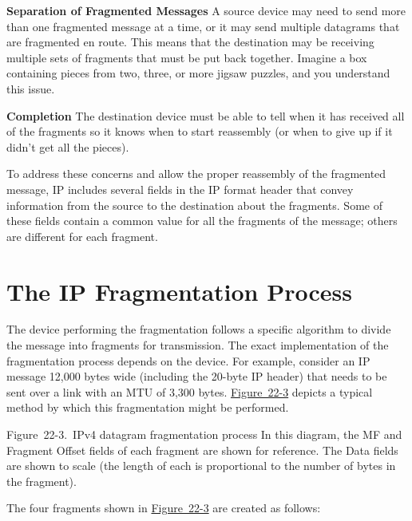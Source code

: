 {\textbf{Separation of Fragmented Messages}} A source device may need to
send more than one fragmented message at a time, or it may send multiple
datagrams that are fragmented en route. This means that the destination
may be receiving multiple sets of fragments that must be put back
together. Imagine a box containing pieces from two, three, or more
jigsaw puzzles, and you understand this issue.

{\textbf{Completion}} The destination device must be able to tell when
it has received all of the fragments so it knows when to start
reassembly (or when to give up if it didn't get all the pieces).

To address these concerns and allow the proper reassembly of the
fragmented message, IP includes several fields in the IP format header
that convey information from the source to the destination about the
fragments. Some of these fields contain a common value for all the
fragments of the message; others are different for each fragment.




\section{The IP Fragmentation Process}

\protect\hypertarget{ch22s02.htmlux5cux23idx-CHP-22-0808}{}{}The device
performing the fragmentation follows a specific algorithm to divide the
message into fragments for transmission. The exact implementation of the
fragmentation process depends on the device. For example, consider an IP
message 12,000 bytes wide (including the 20-byte IP header) that needs
to be sent over a link with an MTU of 3,300 bytes.
\protect\hyperlink{ch22s02.htmlux5cux23ipv4_datagram_fragmentation_process_in_t}{Figure~22-3}
depicts a typical method by which this fragmentation might be performed.

\protect\hypertarget{ch22s02.htmlux5cux23ipv4_datagram_fragmentation_process_in_t}{}{}

\protect\hypertarget{ch22s02.htmlux5cux23I_mediaobject8_d1e23900}{}{}

Figure~22-3.~IPv4 datagram fragmentation process In this diagram, the MF
and Fragment Offset fields of each fragment are shown for reference. The
Data fields are shown to scale (the length of each is proportional to
the number of bytes in the fragment).

The four fragments shown in
\protect\hyperlink{ch22s02.htmlux5cux23ipv4_datagram_fragmentation_process_in_t}{Figure~22-3}
are created as follows:


